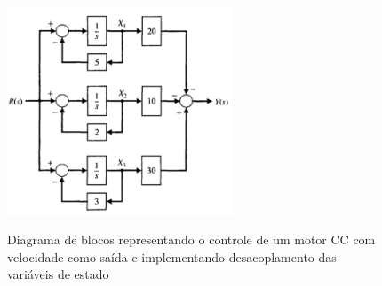 \begin{figure}[!htb]
    \centering
    \caption{Diagrama de blocos representando o controle de um motor CC com velocidade como saída e implementando desacoplamento das variáveis de estado}
    \includegraphics[width=0.6\textwidth]{./04-figuras/fund_teorica/ss_decoupled_blocks}
    \label{fig:ss_decoupled}
\end{figure}








